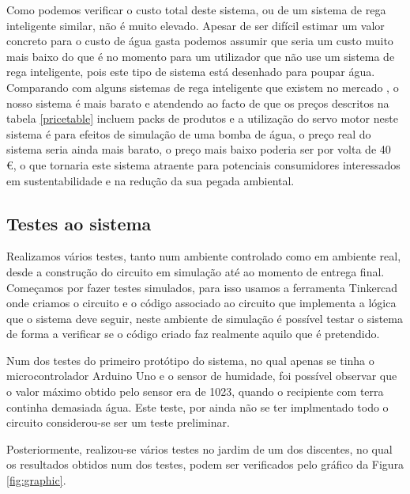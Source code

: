 \documentclass[conference]{IEEEtran}
\begin{document}
Como podemos verificar o custo total deste sistema, ou de um sistema de 
rega inteligente similar, não é muito elevado. Apesar de ser difícil estimar 
um valor concreto para o custo de água gasta podemos assumir que seria um custo 
muito mais baixo do que é no momento para um utilizador que não use um sistema de 
rega inteligente, pois este tipo de sistema está desenhado para poupar água. 
Comparando com alguns sistemas de rega inteligente que existem no 
mercado \cite{amazonOrbit} \cite{amazonNetro}, o nosso sistema é mais barato e 
atendendo ao facto de que os preços descritos na tabela \ref{pricetable} incluem packs de 
produtos e a utilização do servo motor neste sistema é para efeitos de simulação 
de uma bomba de água, o preço real do sistema seria ainda mais barato, o preço mais 
baixo poderia ser por volta de 40 €, o que tornaria este sistema atraente para 
potenciais consumidores interessados em sustentabilidade e na redução da sua pegada 
ambiental.

\subsection{Testes ao sistema}

Realizamos vários testes, tanto num ambiente controlado como em ambiente real, desde 
a construção do circuito em simulação até ao momento de entrega final. Começamos 
por fazer testes simulados, para isso usamos a ferramenta Tinkercad \cite{tinkercad} onde 
criamos o circuito e o código associado ao circuito que implementa a lógica 
que o sistema deve seguir, neste ambiente de simulação é possível testar 
o sistema de forma a verificar se o código criado faz realmente aquilo 
que é pretendido.

Num dos testes do primeiro protótipo do sistema, no qual apenas se tinha o microcontrolador
Arduino Uno e o sensor de humidade, foi possível observar que o valor máximo obtido pelo sensor 
era de 1023, quando o recipiente com terra continha demasiada água. Este teste, por ainda 
não se ter implmentado todo o circuito considerou-se ser um teste preliminar.

Posteriormente, realizou-se vários testes no jardim de um dos discentes, no qual os 
resultados obtidos num dos testes, podem ser verificados pelo gráfico da Figura \ref{fig:graphic}.
\end{document}
